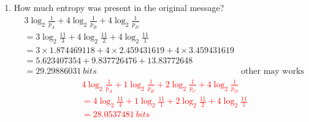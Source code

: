 \documentclass[12pt]{article}
\begin{document}
\begin{enumerate}
\begin{enumerate}
{        }
        \item How much entropy was present in the original message?
        \begin{align*}
            &3 \log_2{\frac{1}{p_A}}+4 \log_2{\frac{1}{p_B}} + 4\log_2{\frac{1}{p_D}} \\  
            &= 3 \log_2{\frac{11}{3}}+4 \log_2{\frac{11}{2}} + 4\log_2{\frac{11}{1}} \\
            &= 3 \times 1.874469118 + 4 \times 2.459431619 + 4 \times 3.459431619 \\
            & = 5.623407354 + 9.837726476 + 13.83772648 \\
            & = 29.29886031 \ bits
            & \text{other may works too}
        \end{align*}
        \textcolor{red}{
        \begin{align*}
            &4 \log_2{\frac{1}{p_A}}+1 \log_2{\frac{1}{p_B}} + 2\log_2{\frac{1}{p_C}} + 4\log_2{\frac{1}{p_D}} \\  
            &= 4 \log_2{\frac{11}{4}}+1 \log_2{\frac{11}{1}} + 2\log_2{\frac{11}{2}} + 4\log_2{\frac{11}{1}} \\
            & = 28.0537481\ bits
        \end{align*}    
        }
    \end{enumerate}


\end{enumerate}
\end{document}
